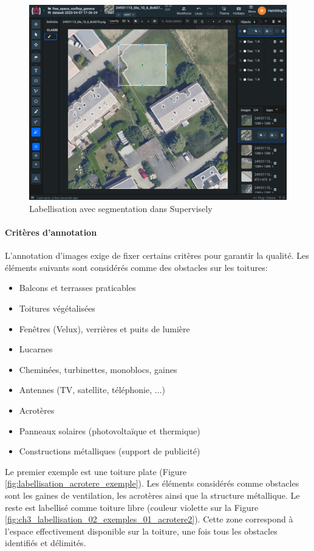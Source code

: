 \begin{figure}[H]
    \centering
    \includegraphics[width=0.97\linewidth]{02-main/figures/ch3/ch3_labellisation_01_outils_04_supervisely_segmentation.png}
    \caption{Labellisation avec segmentation dans Supervisely}
    \label{fig:ch3_labellisation_01_outils_04_supervisely_segmentation}
\end{figure}

\paragraph{Critères d'annotation}
L'annotation d'images exige de fixer certains critères pour garantir la qualité. Les éléments suivants sont considérés comme des obstacles sur les toitures:
\begin{itemize}
    \item Balcons et terrasses praticables
    \item Toitures végétalisées
    \item Fenêtres (Velux), verrières et puits de lumière
    \item Lucarnes
    \item Cheminées, turbinettes, monoblocs, gaines
    \item Antennes (TV, satellite, téléphonie, ...)
    \item Acrotères
    \item Panneaux solaires (photovoltaïque et thermique)
    \item Constructions métalliques (support de publicité)
\end{itemize}

Le premier exemple est une toiture plate (Figure \ref{fig:labellisation_acrotere_exemple}). Les éléments considérés comme obstacles sont les gaines de ventilation, les acrotères ainsi que la structure métallique. Le reste est labellisé comme toiture libre (couleur violette sur la Figure \ref{fig:ch3_labellisation_02_exemples_01_acrotere2}). Cette zone correspond à l'espace effectivement disponible sur la toiture, une fois tous les obstacles identifiés et délimités.

